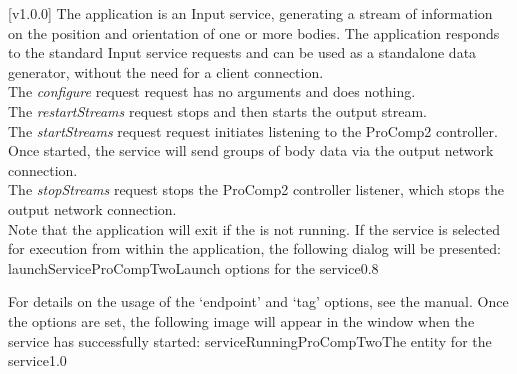 [v1.0.0]
The  application is an Input service,
generating a stream of information on the position and orientation of one or more bodies.
The application responds to the standard Input service requests and can be used as a
standalone data generator, without the need for a client connection.\\

The \emph{configure} request request has no arguments and does nothing.\\

The \emph{restartStreams} request stops and then starts the output stream.\\

The \emph{startStreams} request request initiates listening to the ProComp2 controller.
Once started, the service will send groups of body data via the output \yarp{} network
connection.\\

The \emph{stopStreams} request stops the ProComp2 controller listener, which stops the
output \yarp{} network connection.\\ 

Note that the application will exit if the \emph{\RS} is not running.
\insertAppParameters
\insertTagDescription{\PCtwoI}
\insertInputServiceComment
\condPage
\insertStandardServiceCommands
\secondaryEnd
\condPage
{}
If the service is selected for execution from within the \emph{\MMMU} application, the
following dialog will be presented:
%
{launchServiceProCompTwo}{Launch options for the \emph{\PCtwoI} service}{0.8}

For details on the usage of the `endpoint' and `tag' options, see the \emph{\MMMU} manual.
Once the options are set, the following image will appear in the \emph{\MMMU} window when
the service has successfully started:
%
{serviceRunningProCompTwo}{The \emph{\MMMU} entity for the \emph{\PCtwoI} service}{1.0}
\secondaryEnd
\primaryEnd{}

